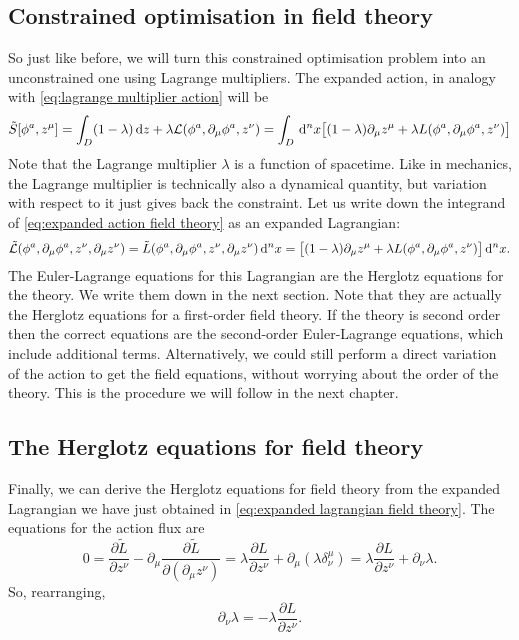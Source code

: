 \documentclass[../main.tex]{subfiles}
\begin{document}
\subsection{Constrained optimisation in field theory}
So just like before, we will turn this constrained optimisation problem into an
unconstrained one using Lagrange multipliers. The expanded action, in analogy with
\cref{eq:lagrange multiplier action} will be
\begin{equation}\label{eq:expanded action field theory}
	\tilde{S}[\phi^a, z^\mu] = \int_D (1 - \lambda) \,\mathrm{d} z + \lambda \mathcal{L}(\phi^a, \partial_\mu
	\phi^a, z^\nu) = \int_D \,\mathrm{d}^n x \big[ (1 - \lambda) \partial_\mu z^\mu + \lambda L(\phi^a,
	\partial_\mu \phi^a, z^\nu) \big]
\end{equation}
Note that the Lagrange multiplier \( \lambda \) is a function of spacetime. Like in
mechanics, the Lagrange multiplier is technically also a dynamical quantity, but variation
with respect to it just gives back the constraint. Let us write down the integrand of
\cref{eq:expanded action field theory} as an expanded Lagrangian:
\begin{equation} \label{eq:expanded lagrangian field theory}
	\tilde{\mathcal{L}}(\phi^a, \partial_\mu \phi^a, z^\nu, \partial_\mu z^\nu) = \tilde{L}(\phi^a,
	\partial_\mu \phi^a, z^\nu, \partial_\mu z^\nu)\,\mathrm{d}^n x = \big[ (1 - \lambda)
	\partial_\mu z^\mu + \lambda L(\phi^a, \partial_\mu \phi^a, z^\nu) \big] \,\mathrm{d}^n x.
\end{equation}
The Euler-Lagrange equations for this Lagrangian are the Herglotz equations for the
theory. We write them down in the next section. Note that they are actually the Herglotz
equations for a first-order field theory. If the theory is second order then the correct
equations are the second-order Euler-Lagrange equations, which include additional terms.
Alternatively, we could still perform a direct variation of the action to get the field
equations, without worrying about the order of the theory. This is the procedure we will
follow in the next chapter. 

\subsection{The Herglotz equations for field theory}
Finally, we can derive the Herglotz equations for field theory from the expanded
Lagrangian we have just obtained in \cref{eq:expanded lagrangian field theory}. The
equations for the action flux are
\begin{equation*}
	0 = \frac{\partial \tilde{L}}{\partial z^\nu} - \partial_\mu \frac{\partial
	\tilde{L}}{\partial(\partial_\mu z^\nu)} = \lambda \frac{\partial L}{\partial z^\nu} +
	\partial_\mu(\lambda \delta_\nu^\mu) = \lambda \frac{\partial L}{\partial z^\nu} +
	\partial_\nu \lambda.
\end{equation*}
So, rearranging,
\begin{equation} \label{eq:euler lagrange multiplier field theory}
	\partial_\nu \lambda = - \lambda \frac{\partial L}{\partial z^\nu}. 
\end{equation}
\end{document}
